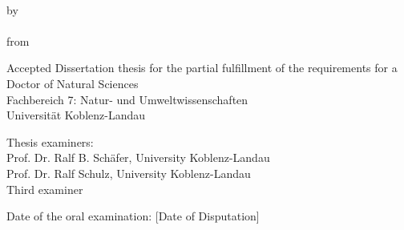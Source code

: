 \begin{titlepage}
    \begin{center}

        \large
        \begingroup
            \vspace{4cm}
            \textbf{\LARGE\spacedallcaps{\myTitleOnTitlePageLineOne}}\\[0.5em]
            \spacedallcaps{\myTitleOnTitlePageLineTwo}
        \endgroup
        
        \vfill

        \begingroup
            by\\[1em]
            \Large \spacedlowsmallcaps{\myName} \\
            \small from \spacedlowsmallcaps{\myLocation}
        \endgroup

        \vfill

        \begingroup
            \small
            Accepted Dissertation thesis for the partial fulfillment of the requirements for a \\
            Doctor of Natural Sciences \\
            Fachbereich 7: Natur- und Umweltwissenschaften \\
            Universität Koblenz-Landau
        \endgroup

        \vfill

        \begingroup
            \small
            Thesis examiners: \\
            Prof. Dr. Ralf B. Schäfer, University Koblenz-Landau\\
            Prof. Dr. Ralf Schulz, University Koblenz-Landau\\
            Third examiner
        \endgroup

        \vfill

        \begingroup
            \small
            Date of the oral examination: [Date of Disputation]
        \endgroup
        
        \vfill                      

    \end{center}       
\end{titlepage}   
 
